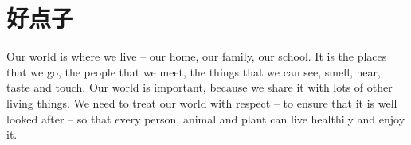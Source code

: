 
\chapter{好点子}
Our world is where we live – our home, our family, our school. It is the places that we go, the people that we meet, the things that we can see, smell, hear, taste and touch. Our world is important, because we share it with lots of other living things. We need to treat our world with respect – to ensure that it is well looked after – so that every person, animal and plant can live healthily and enjoy it.
